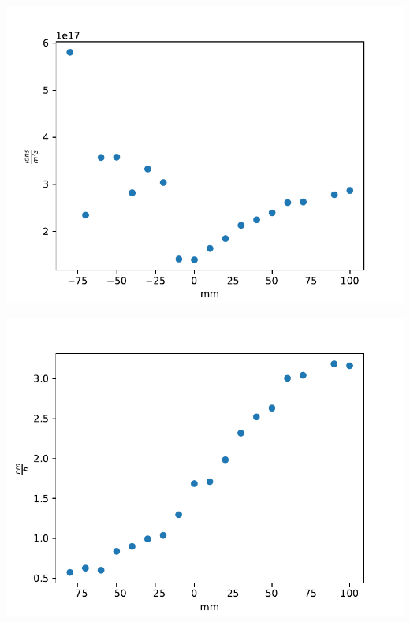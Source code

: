 \documentclass{beamer} %
\begin{document}
\begin{frame}
\begin{minipage}{0.49\textwidth}
        \includegraphics[width=1.1\textwidth]{figures/PosVary_H2_2A_flux.pdf}
    \end{minipage}
    \begin{minipage}{0.49\textwidth}
        \includegraphics[width=1.1\textwidth]{figures/PosVary_H2_2A_worstcaseput.pdf}
    \end{minipage}
\end{frame}
\end{document}
